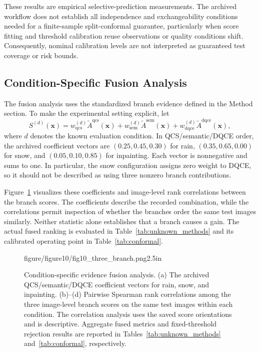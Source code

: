 These results are empirical selective-prediction measurements. The archived
workflow does not establish all independence and exchangeability conditions
needed for a finite-sample split-conformal guarantee, particularly when
score fitting and threshold calibration reuse observations or quality
conditions shift. Consequently, nominal calibration levels are not
interpreted as guaranteed test coverage or risk bounds.

\subsection{Condition-Specific Fusion Analysis}
\label{subsec:fusion_analysis}

The fusion analysis uses the standardized branch evidence defined in the
Method section. To make the experimental setting explicit, let
\begin{equation}
 S^{(d)}(\mathbf{x})=
 w_{\mathrm{qcs}}^{(d)}\widetilde{A}^{\mathrm{qcs}}(\mathbf{x})+
 w_{\mathrm{sem}}^{(d)}\widetilde{A}^{\mathrm{sem}}(\mathbf{x})+
 w_{\mathrm{dqce}}^{(d)}\widetilde{A}^{\mathrm{dqce}}(\mathbf{x}),
 \label{eq:exp_condition_fusion}
\end{equation}
where $d$ denotes the known evaluation condition. In QCS/semantic/DQCE
order, the archived coefficient vectors are $(0.25,0.45,0.30)$ for rain,
$(0.35,0.65,0.00)$ for snow, and $(0.05,0.10,0.85)$ for inpainting.
Each vector is nonnegative and sums to one. In particular, the snow
configuration assigns zero weight to DQCE, so it should not be described as
using three nonzero branch contributions.

Figure~\ref{fig:three_branch} visualizes these coefficients and image-level
rank correlations between the branch scores. The coefficients describe the
recorded combination, while the correlations permit inspection of whether
the branches order the same test images similarly. Neither statistic alone
establishes that a branch causes a gain. The actual fused ranking is
evaluated in Table~\ref{tab:unknown_methods} and its calibrated operating
point in Table~\ref{tab:conformal}.

\begin{figure}[!t]
  \centering
    {figure/figure10/fig10_three_branch.png}{2.5in}
  \caption{Condition-specific evidence fusion analysis. (a) The archived
  QCS/semantic/DQCE coefficient vectors for rain, snow, and inpainting.
  (b)--(d) Pairwise Spearman rank correlations among the three image-level
  branch scores on the same test images within each condition. The
  correlation analysis uses the saved score orientations and is descriptive.
  Aggregate fused metrics and fixed-threshold rejection results are reported
  in Tables~\ref{tab:unknown_methods} and~\ref{tab:conformal}, respectively.}
  \label{fig:three_branch}
\end{figure}

